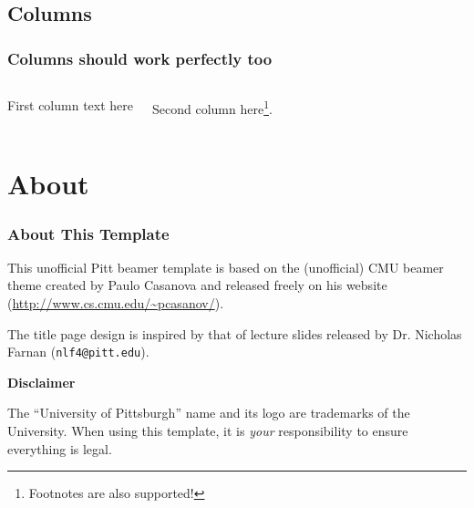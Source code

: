 \documentclass{beamer}
\begin{document}
\subsection{Columns}

\begin{frame}
	\frametitle{Columns should work perfectly too}

	\begin{columns}[onlytextwidth,t]
			First column text here

			Second column here\footnote{Footnotes are also supported!}.
	\end{columns}
\end{frame}

\section{About}

\begin{frame}
	\frametitle{About This Template}
	
	This unofficial Pitt beamer template is based on the (unofficial) CMU beamer theme created by Paulo Casanova and released freely on his website (\url{http://www.cs.cmu.edu/~pcasanov/}).\break
	
	The title page design is inspired by that of lecture slides released by Dr. Nicholas Farnan (\texttt{nlf4@pitt.edu}).\break
	
	{\large \textbf{Disclaimer}\break}
	
	The ``University of Pittsburgh'' name and its logo are trademarks of the University. When using this template, it is \textit{your} responsibility to ensure everything is legal.
\end{frame}
\end{document}
